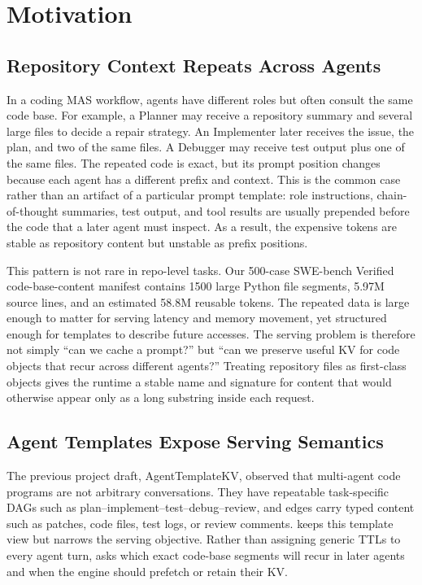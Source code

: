 \section{Motivation}

\subsection{Repository Context Repeats Across Agents}

In a coding MAS workflow, agents have different roles but often consult the same code base.
For example, a Planner may receive a repository summary and several large files to decide a repair strategy.
An Implementer later receives the issue, the plan, and two of the same files.
A Debugger may receive test output plus one of the same files.
The repeated code is exact, but its prompt position changes because each agent has a different prefix and context.
This is the common case rather than an artifact of a particular prompt template: role instructions, chain-of-thought summaries, test output, and tool results are usually prepended before the code that a later agent must inspect.
As a result, the expensive tokens are stable as repository content but unstable as prefix positions.

This pattern is not rare in repo-level tasks.
Our 500-case SWE-bench Verified code-base-content manifest contains 1500 large Python file segments, 5.97M source lines, and an estimated 58.8M reusable tokens.
The repeated data is large enough to matter for serving latency and memory movement, yet structured enough for templates to describe future accesses.
The serving problem is therefore not simply ``can we cache a prompt?'' but ``can we preserve useful KV for code objects that recur across different agents?''
Treating repository files as first-class objects gives the runtime a stable name and signature for content that would otherwise appear only as a long substring inside each request.

\subsection{Agent Templates Expose Serving Semantics}

The previous project draft, AgentTemplateKV, observed that multi-agent code programs are not arbitrary conversations.
They have repeatable task-specific DAGs such as plan--implement--test--debug--review, and edges carry typed content such as patches, code files, test logs, or review comments.
\system keeps this template view but narrows the serving objective.
Rather than assigning generic TTLs to every agent turn, \system asks which exact code-base segments will recur in later agents and when the engine should prefetch or retain their KV.

